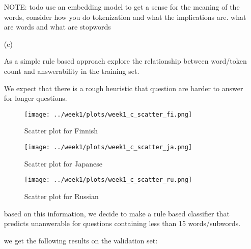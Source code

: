 \documentclass{article}
\begin{document}
\begin{enumerate}
    NOTE: todo use an embedding model to get a sense for the meaning of the words, consider how you do tokenization and 
    what the implications are. what are words and what are stopwords

    \item[(c)] 
    
    As a simple rule based approach explore the relationship between word/token count and answerability in the training set. 

    We expect that there is a rough heuristic that question are harder to answer for longer questions. 

    \begin{figure}[h]
        \centering
        \texttt{[image: ../week1/plots/week1\_c\_scatter\_fi.png]}
        \caption{Scatter plot for Finnish}
        \label{fig:scatter_fi}
    \end{figure}

    \begin{figure}[h]
        \centering
        \texttt{[image: ../week1/plots/week1\_c\_scatter\_ja.png]}
        \caption{Scatter plot for Japanese}
        \label{fig:scatter_ja}
    \end{figure}
    
    \begin{figure}[h]
        \centering
        \texttt{[image: ../week1/plots/week1\_c\_scatter\_ru.png]}
        \caption{Scatter plot for Russian}
        \label{fig:scatter_ru}
    \end{figure}


    based on this information, we decide to make a rule based classifier that predicts unanwerable for questions containing less than 15 words/subwords.

    we get the following results on the validation set:


\end{enumerate}
\end{document}
